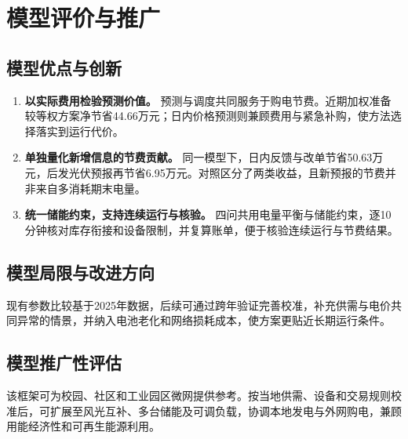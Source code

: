 \section{模型评价与推广}

\subsection{模型优点与创新}

\begin{enumerate}
    \item \textbf{以实际费用检验预测价值。}
    预测与调度共同服务于购电节费。近期加权准备较等权方案净节省44.66万元；日内价格预测则兼顾费用与紧急补购，使方法选择落实到运行代价。

    \item \textbf{单独量化新增信息的节费贡献。}
    同一模型下，日内反馈与改单节省50.63万元，后发光伏预报再节省6.95万元。对照区分了两类收益，且新预报的节费并非来自多消耗期末电量。

    \item \textbf{统一储能约束，支持连续运行与核验。}
    四问共用电量平衡与储能约束，逐10分钟核对库存衔接和设备限制，并复算账单，便于核验连续运行与节费结果。
\end{enumerate}

\subsection{模型局限与改进方向}

现有参数比较基于2025年数据，后续可通过跨年验证完善校准，补充供需与电价共同异常的情景，并纳入电池老化和网络损耗成本，使方案更贴近长期运行条件。

\subsection{模型推广性评估}

该框架可为校园、社区和工业园区微网提供参考。按当地供需、设备和交易规则校准后，可扩展至风光互补、多台储能及可调负载，协调本地发电与外网购电，兼顾用能经济性和可再生能源利用。
